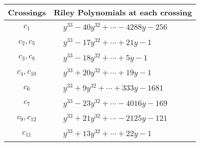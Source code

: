 \documentclass[1p]{elsarticle_modified}
\theoremstyle{definition}
\begin{document}
\begin{tabular}{m{50pt}|m{274pt}}
Crossings & \hspace{64pt}Riley Polynomials at each crossing \\
\hline $$\begin{aligned}c_{1}\end{aligned}$$&$\begin{aligned}
&y^{33}-40 y^{32}+\cdots-4288 y-256
\end{aligned}$\\
\hline $$\begin{aligned}c_{2},c_{5}\end{aligned}$$&$\begin{aligned}
&y^{33}-17 y^{32}+\cdots+21 y-1
\end{aligned}$\\
\hline $$\begin{aligned}c_{3},c_{8}\end{aligned}$$&$\begin{aligned}
&y^{33}-18 y^{32}+\cdots+5 y-1
\end{aligned}$\\
\hline $$\begin{aligned}c_{4},c_{10}\end{aligned}$$&$\begin{aligned}
&y^{33}+20 y^{32}+\cdots+19 y-1
\end{aligned}$\\
\hline $$\begin{aligned}c_{6}\end{aligned}$$&$\begin{aligned}
&y^{33}+9 y^{32}+\cdots+333 y-1681
\end{aligned}$\\
\hline $$\begin{aligned}c_{7}\end{aligned}$$&$\begin{aligned}
&y^{33}-23 y^{32}+\cdots-4016 y-169
\end{aligned}$\\
\hline $$\begin{aligned}c_{9},c_{12}\end{aligned}$$&$\begin{aligned}
&y^{33}+21 y^{32}+\cdots-2125 y-121
\end{aligned}$\\
\hline $$\begin{aligned}c_{11}\end{aligned}$$&$\begin{aligned}
&y^{33}+13 y^{32}+\cdots+22 y-1
\end{aligned}$\\
\hline
\end{tabular}\\~\\
\end{document}
